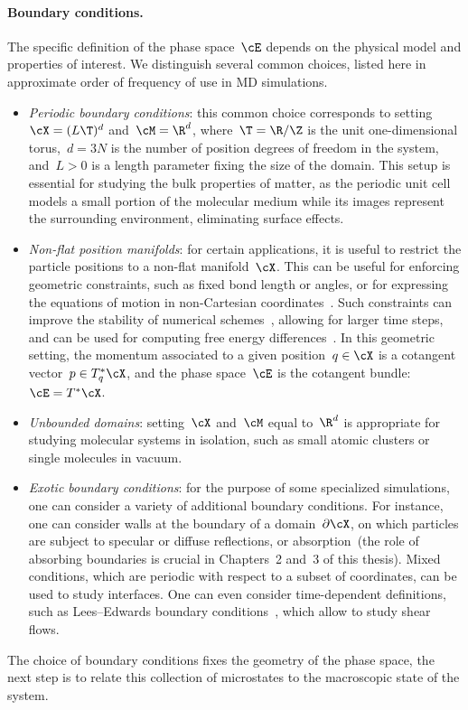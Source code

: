 \paragraph{Boundary conditions.}
The specific definition of the phase space~$\cE$ depends on the physical model and properties of interest. We distinguish several common choices,  listed here in approximate order of frequency of use in MD simulations.
\begin{itemize}
    \item{\textit{Periodic boundary conditions}: this common choice corresponds to setting~$\cX = (L\T)^d$ and~$\cM=\R^d$, where~$\T=\R/\Z$ is the unit one-dimensional torus,~$d=3N$ is the number of position degrees of freedom in the system, and~$L>0$ is a length parameter fixing the size of the domain. This setup is essential for studying the bulk properties of matter, as the periodic unit cell models a small portion of the molecular medium while its images represent the surrounding environment, eliminating surface effects.}
    \item{\textit{Non-flat position manifolds}: for certain applications, it is useful to restrict the particle positions to a non-flat manifold~$\cX$. This can be useful for enforcing geometric constraints, such as fixed bond length or angles, or for expressing the equations of motion in non-Cartesian coordinates~\cite{VJ15}. Such constraints can improve the stability of numerical schemes~\cite{RCB77,A83,BKLS95}, allowing for larger time steps, and can be used for computing free energy differences~\cite{SC98,LRS12}. In this geometric setting, the momentum associated to a given position~$q\in\cX$ is a cotangent vector~$p\in T_q^*\cX$, and the phase space~$\cE$ is the cotangent bundle:~$\cE=T^*\cX$.}
    \item{\textit{Unbounded domains}: setting~$\cX$ and~$\cM$ equal to~$\R^d$ is appropriate for studying molecular systems in isolation, such as small atomic clusters or single molecules in vacuum.}
    \item{\textit{Exotic boundary conditions}: for the purpose of some specialized simulations, one can consider a variety of additional boundary conditions. For instance, one can consider walls at the boundary of a domain~$\partial\cX$, on which particles are subject to specular or diffuse reflections, or absorption~(the role of absorbing boundaries is crucial in Chapters~2 and~3 of this thesis). Mixed conditions, which are periodic with respect to a subset of coordinates, can be used to study interfaces. One can even consider time-dependent definitions, such as Lees--Edwards boundary conditions~\cite{LE72}, which allow to study shear flows.}
\end{itemize}    
The choice of boundary conditions fixes the geometry of the phase space, the next step is to relate this collection of microstates to the macroscopic state of the system. 

